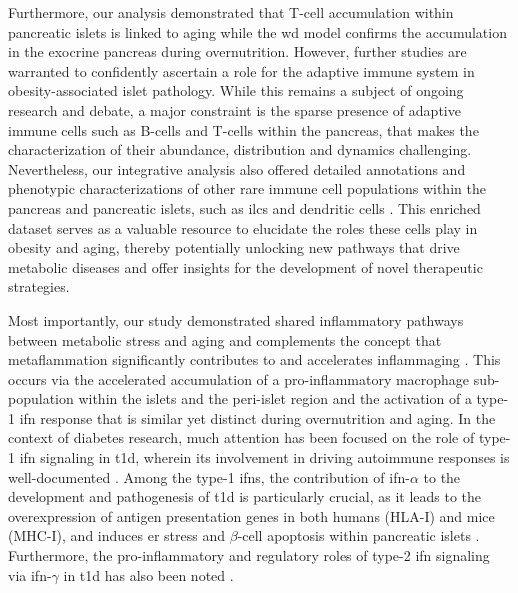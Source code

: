 \par Furthermore, our analysis demonstrated that T-cell accumulation within pancreatic islets is linked to aging while the \gls{wd} model confirms the accumulation in the exocrine pancreas during overnutrition. However, further studies are warranted to confidently ascertain a role for the adaptive immune system in obesity-associated islet pathology. While this remains a subject of ongoing research and debate, a major constraint is the sparse presence of adaptive immune cells such as B-cells and T-cells within the pancreas, that makes the characterization of their abundance, distribution and dynamics challenging. Nevertheless, our integrative analysis also offered detailed annotations and phenotypic characterizations of other rare immune cell populations within the pancreas and pancreatic islets, such as \glspl{ilc} \textbf{\cite{dalmas_interleukin-33-activated_2017}} and dendritic cells \textbf{\cite{calderon_dendritic_2008,zirpel_islet-resident_2021}}. This enriched dataset serves as a valuable resource to elucidate the roles these cells play in obesity and aging, thereby potentially unlocking new pathways that drive metabolic diseases and offer insights for the development of novel therapeutic strategies.\\

\par Most importantly, our study demonstrated shared inflammatory pathways between metabolic stress and aging and complements the concept that metaflammation significantly contributes to and accelerates inflammaging \textbf{\cite{franceschi_continuum_2018}}. This occurs via the accelerated accumulation of a pro-inflammatory macrophage sub-population within the islets and the peri-islet region and the activation of a type-1 \acrfull{ifn} response that is similar yet distinct during overnutrition and aging. In the context of diabetes research, much attention has been focused on the role of type-1 \gls{ifn} signaling in \gls{t1d}, wherein its involvement in driving autoimmune responses is well-documented \textbf{\cite{marroqui_type_2021,newby_type_2017}}. Among the type-1 \glspl{ifn}, the contribution of \gls{ifn}-$\alpha$ to the development and pathogenesis of \gls{t1d} is particularly crucial, as it leads to the overexpression of antigen presentation genes in both humans (HLA-I) and mice (MHC-I), and induces \gls{er} stress and $\beta$-cell apoptosis within pancreatic islets \textbf{\cite{marroqui_interferon-_2017,marro_progression_2017,lombardi_interferon_2018,colli_integrated_2020,jiang_interferon-_2022,coomans_de_brachene_interferons_2024}}. Furthermore, the pro-inflammatory and regulatory roles of type-2 \gls{ifn} signaling via \gls{ifn}-$\gamma$ in \gls{t1d} has also been noted \textbf{\cite{coomans_de_brachene_interferons_2024,de_george_inflammation_2023}}.\\

